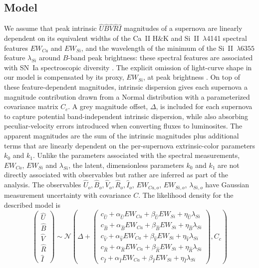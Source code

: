 \documentclass{aastex61}   	%
\begin{document}
\subsection{Model}
We assume 
that  peak intrinsic ${\hat{U}}{\hat{B}}\hat{V}\hat{R}\hat{I}$ magnitudes of a supernova are linearly dependent
on its
 equivalent widths of the Ca~II H\&K and Si~II~$\lambda$4141 spectral features
$EW_{Ca}$ and $EW_{Si}$,
and the wavelength of the minimum of 
the Si~II~$\lambda6355$ feature $\lambda_{Si}$
around $B$-band peak brightness:
these spectral features are associated with SN~Ia  spectroscopic diversity  
\citep{2006PASP..118..560B, 2008A&A...492..535A, 2009A&A...500L..17B, 2009PASP..121..238B, 2009ApJ...699L.139W, 2011ApJ...729...55F}.
The explicit omission of light-curve shape in our model is compensated by its proxy,
$EW_{Si}$, at peak brightness
\citep{2008A&A...492..535A, 2011A&A...529L...4C}. On top of these feature-dependent magnitudes, intrinsic dispersion
gives each supernova a magnitude contribution drawn from a Normal distribution with a parameterized covariance matrix
$C_c$.  A grey magnitude offset, $\Delta$, is included for each supernova
to capture 
potential
band-independent intrinsic dispersion, while also absorbing peculiar-velocity errors introduced when converting
fluxes to luminosites.
The apparent magnitudes are the sum of the intrinsic magnitudes plus additional terms that are linearly dependent on the
per-supernova
extrinsic-color parameters $k_0$ and $k_1$.  
Unlike the parameters associated with
the spectral measurements, $EW_{Ca}$, $EW_{Si}$ and $\lambda_{Si}$,  the latent,
\color{red}
dimensionless
\color{black}
parameters $k_0$ and $k_1$ are not directly associated
with observables but rather are inferred as part of the analysis.
The observables
$\hat{U}_o, {\hat{B}}_o, {\hat{V}}_o, {\hat{R}}_o, {\hat{I}}_o$, $EW_{Ca,o}$, $EW_{Si,o}$, $\lambda_{Si,o}$
have Gaussian measurement uncertainty with covariance $C$.
The
likelihood density for the described model
is
\begin{equation}
\begin{pmatrix}
{\hat{U}}\\{\hat{B}}\\{\hat{V}}\\{\hat{R}}\\{\hat{I}}
\end{pmatrix}
\sim \mathcal{N}
\left(
\Delta +
\begin{pmatrix}
c_{\hat{U}}+\alpha_{\hat{U}} EW_{Ca} + \beta_{\hat{U}} EW_{Si} + \eta_{\hat{U}} \lambda_{Si} \\
c_{\hat{B}}+\alpha_{\hat{B}} EW_{Ca} + \beta_{\hat{B}} EW_{Si} + \eta_{\hat{B}} \lambda_{Si}  \\
c_{\hat{V}}+\alpha_{\hat{V}} EW_{Ca} + \beta_{\hat{V}} EW_{Si} + \eta_{\hat{V}} \lambda_{Si} \\
c_{\hat{R}}+\alpha_{\hat{R}} EW_{Ca} + \beta_{\hat{R}} EW_{Si} + \eta_{\hat{R}} \lambda_{Si} \\
c_{\hat{I}}+\alpha_{\hat{I}} EW_{Ca} + \beta_{\hat{I}} EW_{Si}+ \eta_{\hat{I}} \lambda_{Si}
\end{pmatrix}
,C_{c}
\right)
\label{ewsiv:eqn}
\end{equation}
\end{document}
